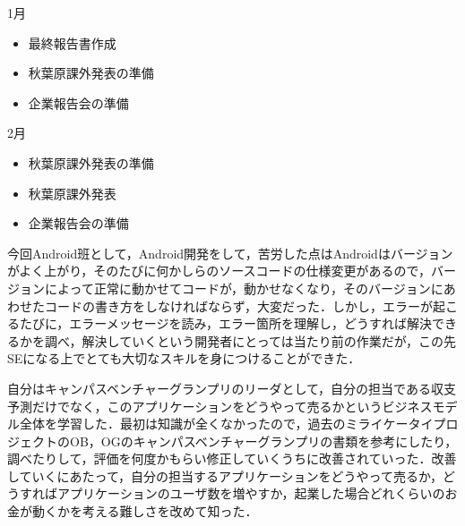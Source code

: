 1月
\begin{itemize}
\item 最終報告書作成
\item 秋葉原課外発表の準備
\item 企業報告会の準備
\end{itemize}
2月
\begin{itemize}
\item 秋葉原課外発表の準備
\item 秋葉原課外発表
\item 企業報告会の準備
\end{itemize}
\par
今回Android班として，Android開発をして，苦労した点はAndroidはバージョンがよく上がり，そのたびに何かしらのソースコードの仕様変更があるので，バージョンによって正常に動かせてコードが，動かせなくなり，そのバージョンにあわせたコードの書き方をしなければならず，大変だった．しかし，エラーが起こるたびに，エラーメッセージを読み，エラー箇所を理解し，どうすれば解決できるかを調べ，解決していくという開発者にとっては当たり前の作業だが，この先SEになる上でとても大切なスキルを身につけることができた．
\par
自分はキャンパスベンチャーグランプリのリーダとして，自分の担当である収支予測だけでなく，このアプリケーションをどうやって売るかというビジネスモデル全体を学習した．最初は知識が全くなかったので，過去のミライケータイプロジェクトのOB，OGのキャンパスベンチャーグランプリの書類を参考にしたり，調べたりして，評価を何度かもらい修正していくうちに改善されていった．改善していくにあたって，自分の担当するアプリケーションをどうやって売るか，どうすればアプリケーションのユーザ数を増やすか，起業した場合どれくらいのお金が動くかを考える難しさを改めて知った．

